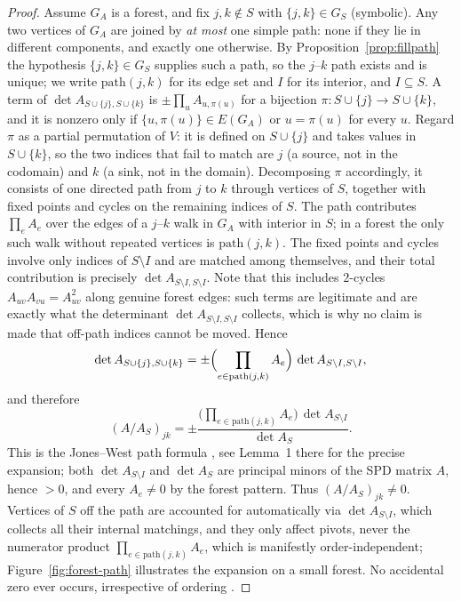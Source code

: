 \documentclass[11pt]{article}
\theoremstyle{plain}
\theoremstyle{definition}
\theoremstyle{remark}
\begin{document}
\begin{aiblock}
\begin{proof}
Assume $G_A$ is a forest, and fix $j,k\notin S$ with $\{j,k\}\in G_S$ (symbolic). Any two vertices
of $G_A$ are joined by \emph{at most} one simple path: none if they lie in different components, and
exactly one otherwise. By Proposition~\ref{prop:fillpath} the hypothesis $\{j,k\}\in G_S$ supplies
such a path, so the $j$--$k$ path exists and is unique; we write $\mathrm{path}(j,k)$ for its edge set
and $I$ for its interior, and $I\subseteq S$. A term of
$\det A_{S\cup\{j\},S\cup\{k\}}$ is $\pm\prod_{u}A_{u,\pi(u)}$ for a bijection
$\pi:S\cup\{j\}\to S\cup\{k\}$, and it is nonzero only if $\{u,\pi(u)\}\in E(G_A)$ or $u=\pi(u)$ for
every $u$. Regard $\pi$ as a partial permutation of $V$: it is defined on $S\cup\{j\}$ and takes values
in $S\cup\{k\}$, so the two indices that fail to match are $j$ (a source, not in the codomain) and $k$
(a sink, not in the domain). Decomposing $\pi$ accordingly, it consists of one directed path from $j$
to $k$ through vertices of $S$, together with fixed points and cycles on the remaining indices of $S$.
The path contributes $\prod_{e}A_e$ over the edges of a $j$--$k$ walk in $G_A$ with interior in $S$;
in a forest the only such walk without repeated vertices is $\mathrm{path}(j,k)$. The fixed points and
cycles involve only indices of $S\setminus I$ and are matched among themselves, and their total
contribution is precisely $\det A_{S\setminus I,S\setminus I}$. Note that this includes $2$-cycles
$A_{uv}A_{vu}=A_{uv}^2$ along genuine forest edges: such terms are legitimate and are exactly what the
determinant $\det A_{S\setminus I,S\setminus I}$ collects, which is why no claim is made that off-path
indices cannot be moved. Hence
\[
\det A_{S\cup\{j\},S\cup\{k\}} = \pm\Bigl(\prod_{e\in\mathrm{path}(j,k)} A_e\Bigr)\,\det A_{S\setminus I,S\setminus I},
\]
and therefore
\[
(A/A_S)_{jk}= \pm\frac{\bigl(\prod_{e\in\mathrm{path}(j,k)} A_e\bigr)\,\det A_{S\setminus I}}{\det A_{S}}.
\]
This is the Jones--West path formula \cite{Jones}, see Lemma~1 there for the precise expansion; both $\det A_{S\setminus I}$ and $\det A_{S}$ are principal minors of the SPD matrix $A$, hence $>0$, and every $A_e\neq0$ by the forest pattern. Thus $(A/A_S)_{jk}\neq0$. Vertices of $S$ off the path are accounted for automatically via $\det A_{S\setminus I}$, which collects all their internal matchings, and they only affect pivots, never the numerator product $\prod_{e\in\mathrm{path}(j,k)} A_e$, which is manifestly order-independent; Figure~\ref{fig:forest-path} illustrates the expansion on a
small forest. No accidental zero ever occurs, irrespective of ordering \cite{Malouche,Jones}.
\end{proof}


\end{aiblock}
\end{document}
